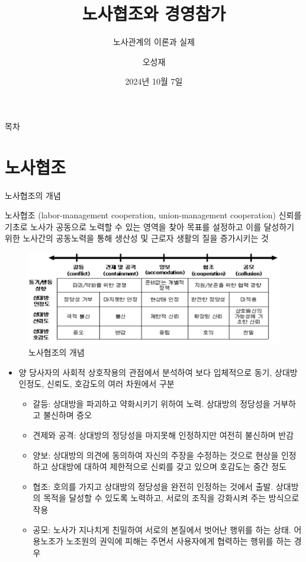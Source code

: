 \documentclass[aspectratio=169,xcolor=dvipsnames,handout]{beamer}
\title{노사협조와 경영참가}
\subtitle{노사관계의 이론과 실제}
\author{오성재}
\institute[CNU]
{\relax
    충남대학교 경제학과
    }
\date{2024년 10월 7일}
\begin{document}

\frame{\titlepage}

\begin{frame}{목차}
    \small
    \tableofcontents[hideallsubsections]
\end{frame}

\section{노사협조}


\begin{frame}[allowframebreaks]{노사협조의 개념}
    \begin{block}{노사협조 (labor-management cooperation, union-management cooperation)}
        신뢰를 기초로 노사가 공동으로 노력할 수 있는 영역을 찾아 목표를 설정하고 이를 달성하기 위한 노사간의 공동노력을 통해 생산성 및 근로자 생활의 질을 증가시키는 것
    \end{block}
    \framebreak\relax
    \centering
    \begin{figure}
        \includegraphics[width=.8\textwidth]{pic/노사협조개념도.png}
        \caption{노사협조의 개념}
    \end{figure}
    \begin{itemize}[<+->]
        \item 양 당사자의 사회적 상호작용의 관점에서 분석하여 보다 입체적으로 동기, 상대방 인정도, 신뢰도, 호감도의 여러 차원에서 구분
        \begin{itemize}[<+->]
            \item 갈등: 상대방을 파괴하고 약화시키기 위하여 노력. 상대방의 정당성을 거부하고 불신하며 증오
            \item 견제와 공격: 상대방의 정당성을 마지못해 인정하지만 여전히 불신하며 반감
            \item 양보: 상대방의 의견에 동의하여 자신의 주장을 수정하는 것으로 현상을 인정하고 상대방에 대하여 제한적으로 신뢰를 갖고 있으며 호감도는 중간 정도
            \item 협조: 호의를 가지고 상대방의 정당성을 완전히 인정하는 것에서 출발. 상대방의 목적을 달성할 수 있도록 노력하고, 서로의 조직을 강화시켜 주는 방식으로 작용
            \item 공모: 노사가 지나치게 친밀하여 서로의 본질에서 벗어난 행위를 하는 상태. 어용노조가 노조원의 권익에 피해는 주면서 사용자에게 협력하는 행위를 하는 경우
        \end{itemize}
    \end{itemize}
\end{frame}
\end{document}
